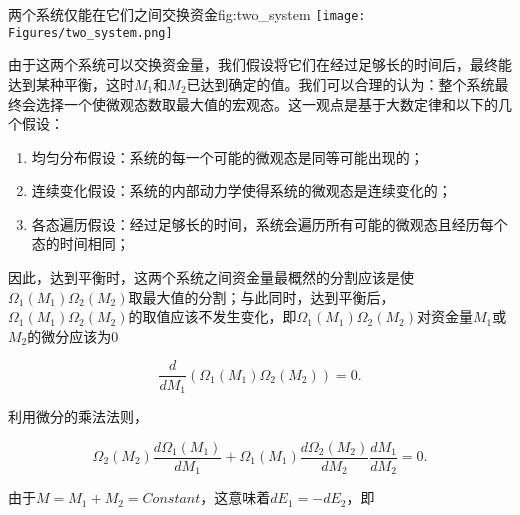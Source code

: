 \documentclass[tsinghuacite]{HustGraduPaper}
\begin{document}
			\vspace{1.5em}  
			
			\begin{generalfig}[htb]{两个系统仅能在它们之间交换资金}{fig:two_system}
				\texttt{[image: Figures/two\_system.png]}
			\end{generalfig}
			
			\vspace{1.5em}  
			
			由于这两个系统可以交换资金量，我们假设将它们在经过足够长的时间后，最终能达到某种平衡，这时$M_1$和$M_2$已达到确定的值。我们可以合理的认为：整个系统最终会选择一个使微观态数取最大值的宏观态。这一观点是基于大数定律和以下的几个假设：
			
			\begin{enumerate}
				\item 均匀分布假设：系统的每一个可能的微观态是同等可能出现的；
				
				\item 连续变化假设：系统的内部动力学使得系统的微观态是连续变化的；
				
				\item 各态遍历假设：经过足够长的时间，系统会遍历所有可能的微观态且经历每个态的时间相同；
				
			\end{enumerate}
			
			因此，达到平衡时，这两个系统之间资金量最概然的分割应该是使$\Omega_1 (M_1) \Omega_2 (M_2)$取最大值的分割；与此同时，达到平衡后，$\Omega_1 (M_1) \Omega_2 (M_2)$的取值应该不发生变化，即$\Omega_1 (M_1) \Omega_2 (M_2)$对资金量$M_1$或$M_2$的微分应该为0
			
			\begin{equation}
				\frac{d}{d M_1} ( \Omega_1 (M_1) \Omega_2 (M_2) ) = 0.  \label{eq7}
			\end{equation}
			
			\vspace{1.5em}  
			
			利用微分的乘法法则，
			
			\begin{equation}
				\Omega_2 (M_2) \frac{d \Omega_1 (M_1) }{d M_1}  + \Omega_1 (M_1) \frac{d \Omega_2 (M_2) }{d M_2} \frac{d M_1}{d M_2}  = 0. \label{eq8}
			\end{equation}
			
			\vspace{1.5em}  
			
			由于$M = M_1 + M_2 = Constant$，这意味着$d E_1 = - d E_2$，即
			
\end{document}
